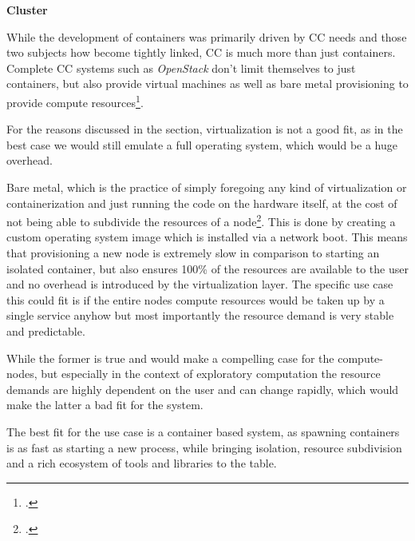 
\textbf{Cluster}
\label{asp:cluster}

While the development of containers was primarily driven by \ac{CC} needs and those two subjects
how become tightly linked, \ac{CC} is much more than just containers.
Complete \ac{CC} systems such as \textit{OpenStack} don't limit themselves to just containers,
but also provide virtual machines as well as bare metal provisioning to provide compute resources\footcite{jacksonOpenStackCloudComputing2013}.

For the reasons discussed in the  section, virtualization is not a good fit,
as in the best case we would still emulate a full operating system, which would be a huge overhead.

Bare metal, which is the practice of simply foregoing any kind of virtualization or containerization
and just running the code on the hardware itself, at the cost of not being able to subdivide the resources of a node\footcite{canonicalMetalService}.
This is done by creating a custom operating system image which is installed via a network boot.
This means that provisioning a new node is extremely slow in comparison to starting an isolated container,
but also ensures 100\% of the resources are available to the user and no overhead is introduced by the virtualization layer.
The specific use case this could fit is if the entire nodes compute resources would be taken up by a single service
anyhow but most importantly the resource demand is very stable and predictable.

While the former is true and would make a compelling case for the compute-nodes,
but especially in the context of exploratory computation the resource demands are highly dependent on the user
and can change rapidly, which would make the latter a bad fit for the system.

The best fit for the use case is a container based system, as spawning containers is as fast as starting a new process,
while bringing isolation, resource subdivision and a rich ecosystem of tools and libraries to the table.


